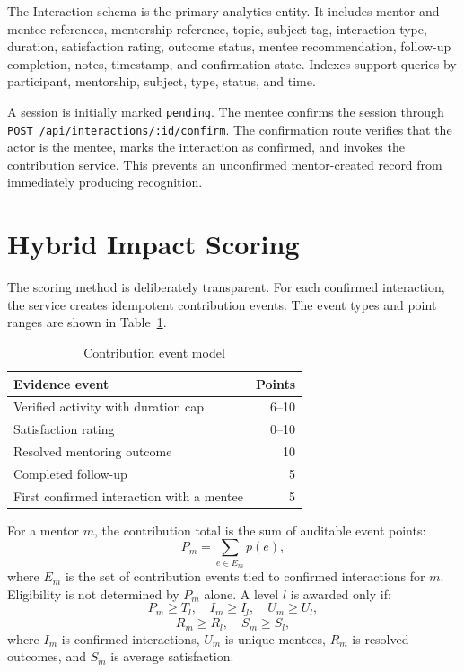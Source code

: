 \documentclass[conference]{IEEEtran}
\begin{document}
The Interaction schema is the primary analytics entity. It includes mentor and mentee references, mentorship reference, topic, subject tag, interaction type, duration, satisfaction rating, outcome status, mentee recommendation, follow-up completion, notes, timestamp, and confirmation state. Indexes support queries by participant, mentorship, subject, type, status, and time.

A session is initially marked \texttt{pending}. The mentee confirms the session through \texttt{POST /api/interactions/:id/confirm}. The confirmation route verifies that the actor is the mentee, marks the interaction as confirmed, and invokes the contribution service. This prevents an unconfirmed mentor-created record from immediately producing recognition.

\section{Hybrid Impact Scoring}
The scoring method is deliberately transparent. For each confirmed interaction, the service creates idempotent contribution events. The event types and point ranges are shown in Table~\ref{tab:events}.

\begin{table}[t]
\caption{Contribution event model}
\label{tab:events}
\centering
\begin{tabular}{p{}r}
\toprule
Evidence event & Points \\
\midrule
Verified activity with duration cap & 6--10 \\
Satisfaction rating & 0--10 \\
Resolved mentoring outcome & 10 \\
Completed follow-up & 5 \\
First confirmed interaction with a mentee & 5 \\
\bottomrule
\end{tabular}
\end{table}

For a mentor $m$, the contribution total is the sum of auditable event points:
\begin{equation}
P_m = \sum_{e \in E_m} p(e),
\end{equation}
where $E_m$ is the set of contribution events tied to confirmed interactions for $m$. Eligibility is not determined by $P_m$ alone. A level $l$ is awarded only if:
\begin{equation}
P_m \geq T_l,\quad I_m \geq I_l,\quad U_m \geq U_l,
\end{equation}
\begin{equation}
R_m \geq R_l,\quad \bar{S}_m \geq S_l,
\end{equation}
where $I_m$ is confirmed interactions, $U_m$ is unique mentees, $R_m$ is resolved outcomes, and $\bar{S}_m$ is average satisfaction.
\end{document}

